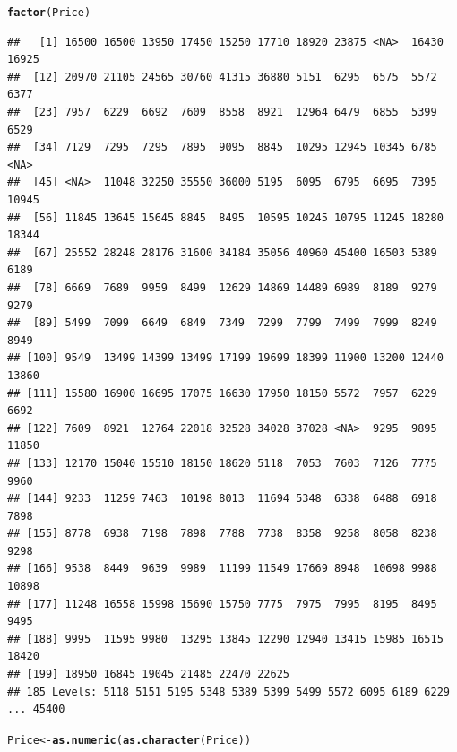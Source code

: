 \documentclass{article}\usepackage[]{graphicx}\usepackage[]{color}
\makeatletter
\newcommand{\hlstd}[1]{\textcolor[rgb]{0.345,0.345,0.345}{#1}}%
\newcommand{\hlkwb}[1]{\textcolor[rgb]{0.69,0.353,0.396}{#1}}%
\newcommand{\hlkwd}[1]{\textcolor[rgb]{0.737,0.353,0.396}{\textbf{#1}}}%
\newenvironment{kframe}{%
 \def\at@end@of@kframe{}%
 \ifinner\ifhmode%
  \def\at@end@of@kframe{\end{minipage}}%
  \begin{minipage}{\columnwidth}%
 \fi\fi%
 \def\FrameCommand##1{\hskip\@totalleftmargin \hskip-\fboxsep
 \colorbox{shadecolor}{##1}\hskip-\fboxsep
     \hskip-\linewidth \hskip-\@totalleftmargin \hskip\columnwidth}%
 \MakeFramed {\advance\hsize-\width
   \@totalleftmargin\z@ \linewidth\hsize
   \@setminipage}}%
 {\par\unskip\endMakeFramed%
 \at@end@of@kframe}
\newenvironment{knitrout}{}{} %
\makeatother
\begin{document}
\begin{knitrout}
\begin{kframe}
\begin{alltt}
\hlkwd{factor}\hlstd{(Price)}
\end{alltt}
\begin{verbatim}
##   [1] 16500 16500 13950 17450 15250 17710 18920 23875 <NA>  16430 16925
##  [12] 20970 21105 24565 30760 41315 36880 5151  6295  6575  5572  6377 
##  [23] 7957  6229  6692  7609  8558  8921  12964 6479  6855  5399  6529 
##  [34] 7129  7295  7295  7895  9095  8845  10295 12945 10345 6785  <NA> 
##  [45] <NA>  11048 32250 35550 36000 5195  6095  6795  6695  7395  10945
##  [56] 11845 13645 15645 8845  8495  10595 10245 10795 11245 18280 18344
##  [67] 25552 28248 28176 31600 34184 35056 40960 45400 16503 5389  6189 
##  [78] 6669  7689  9959  8499  12629 14869 14489 6989  8189  9279  9279 
##  [89] 5499  7099  6649  6849  7349  7299  7799  7499  7999  8249  8949 
## [100] 9549  13499 14399 13499 17199 19699 18399 11900 13200 12440 13860
## [111] 15580 16900 16695 17075 16630 17950 18150 5572  7957  6229  6692 
## [122] 7609  8921  12764 22018 32528 34028 37028 <NA>  9295  9895  11850
## [133] 12170 15040 15510 18150 18620 5118  7053  7603  7126  7775  9960 
## [144] 9233  11259 7463  10198 8013  11694 5348  6338  6488  6918  7898 
## [155] 8778  6938  7198  7898  7788  7738  8358  9258  8058  8238  9298 
## [166] 9538  8449  9639  9989  11199 11549 17669 8948  10698 9988  10898
## [177] 11248 16558 15998 15690 15750 7775  7975  7995  8195  8495  9495 
## [188] 9995  11595 9980  13295 13845 12290 12940 13415 15985 16515 18420
## [199] 18950 16845 19045 21485 22470 22625
## 185 Levels: 5118 5151 5195 5348 5389 5399 5499 5572 6095 6189 6229 ... 45400
\end{verbatim}
\begin{alltt}
\hlstd{Price} \hlkwb{<-} \hlkwd{as.numeric}\hlstd{(}\hlkwd{as.character}\hlstd{(Price))}




\end{alltt}
\end{kframe}
\end{knitrout}
\end{document}
